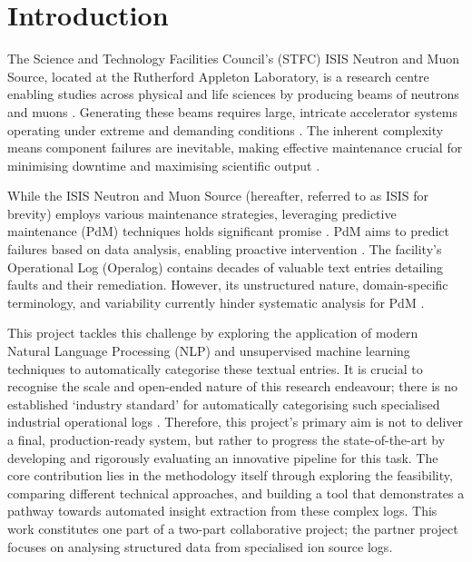 \documentclass[10pt,oneside]{report}
\begin{document}
\chapter{Introduction}

The Science and Technology Facilities Council's (STFC) ISIS Neutron and Muon Source, located at the Rutherford Appleton Laboratory, is a research centre enabling studies across physical and life sciences by producing beams of neutrons and muons \cite{thomason2019isis}. Generating these beams requires large, intricate accelerator systems operating under extreme and demanding conditions \cite{2021practicalguide}. The inherent complexity means component failures are inevitable, making effective maintenance crucial for minimising downtime and maximising scientific output \cite{thomason2019isis}.

While the ISIS Neutron and Muon Source (hereafter, referred to as ISIS for brevity) employs various maintenance strategies, leveraging predictive maintenance (PdM) techniques holds significant promise \cite{thomason2019isis, susto2012predictive}. PdM aims to predict failures based on data analysis, enabling proactive intervention \cite{carvalho2019systematic}. The facility's Operational Log (Operalog) contains decades of valuable text entries detailing faults and their remediation. However, its unstructured nature, domain-specific terminology, and variability currently hinder systematic analysis for PdM \cite{usuga2022using}.

This project tackles this challenge by exploring the application of modern Natural Language Processing (NLP) and unsupervised machine learning techniques to automatically categorise these textual entries. It is crucial to recognise the scale and open-ended nature of this research endeavour; there is no established `industry standard' for automatically categorising such specialised industrial operational logs \cite{carvalho2019systematic}. Therefore, this project's primary aim is not to deliver a final, production-ready system, but rather to progress the state-of-the-art by developing and rigorously evaluating an innovative pipeline for this task. The core contribution lies in the methodology itself through exploring the feasibility, comparing different technical approaches, and building a tool that demonstrates a pathway towards automated insight extraction from these complex logs. This work constitutes one part of a two-part collaborative project; the partner project focuses on analysing structured data from specialised ion source logs.
\end{document}
